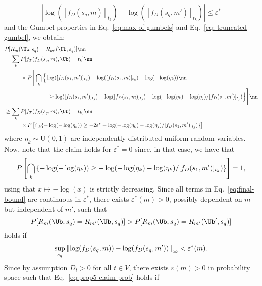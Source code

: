 \begin{equation*}
    |\log([f_D(s_q,m)]_{t_k})-\log([f_D(s_q,m')]_{t_k})|\leq \varepsilon^*
\end{equation*}
and the Gumbel properties in Eq.~\ref{eq:max of gumbels} and Eq.~\ref{eq: truncated gumbel}, we obtain:
%
\begin{align}
        &\PP[R_m(\Ub, s_q)=R_{m'}(\Ub, s_q)] \nn \\
        &=\sum_k \PP[f_T(f_D(s_q,m),\Ub)=t_k] \nn \\
            & \qquad \quad \times \PP\Bigg[
            \bigcap_k \Big\{
            \log( [f_D(s_1, m')]_{t_k}) - \log([f_D(s_1, m)]_{t_k})-\log(-\log (\eta_k)) \nn \\
            & \qquad \qquad \qquad \qquad \geq \log([f_D(s_1, m')]_{t_j}) - \log([f_D(s_1, m)]_{t_j})-\log(-\log(\eta_k) -\log(\eta_j)/[f_D(s_1,m')]_{t_j})
            \Big\}
            \Bigg] \nn \\
            &\geq
            \sum_k \PP[f_T(f_D(s_q,m),\Ub)=t_k] \nn \\
            &\qquad \quad \times\PP\left[
            \cap_k \{
            -\log(-\log (\eta_k)) \geq -2\varepsilon^* -\log(-\log(\eta_k) -\log(\eta_j)/[f_D(s_1,m')]_{t_j})
            \}
            \right] \label{eq:final-bound}
\end{align}
where $\eta_k\sim \text{U}(0,1)$ are independently distributed uniform random variables.
%
Now, note that the claim holds for $\varepsilon^*=0$ since, in that case, we have that
%
\begin{equation*}
   P\left[
        \bigcap_k \left\{
        -\log(-\log (\eta_k)) \geq -\log(-\log(\eta_k) -\log(\eta_k)/[f_D(s_1,m')]_{t_k})
        \right\} \right]=1,
\end{equation*}
%
using that $x\mapsto -\log(x)$ is strictly decreasing. 
%
Since all terms in Eq.~\ref{eq:final-bound} are continuous in $\varepsilon^*$, there exists $\varepsilon^*(m) >0 $, possibly dependent on $m$ but independent of $m'$, such that 
\begin{equation}\label{eq:prop5 claim prob}
    \PP[R_m(\Ub, s_q)=R_{m'}(\Ub, s_q)] > \PP[R_m(\Ub, s_q)=R_{m'}(\Ub', s_q)]
\end{equation}
holds if
\begin{equation*}
    \sup_{s_q} \left\lVert\log(f_D(s_q,m))-\log(f_D(s_q, m'))\right\rVert_\infty < \varepsilon^*(m).
\end{equation*}
Since by assumption $D_t>0$ for all $t\in V$, there exists $\varepsilon(m)>0$ in probability space such that Eq.~\ref{eq:prop5 claim prob} holds if

